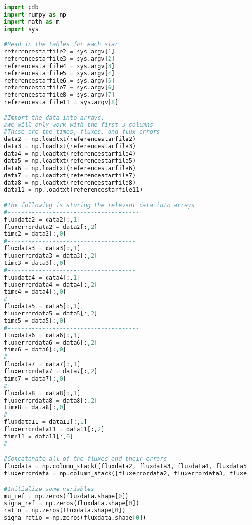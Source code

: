 \documentclass{aastex}
\begin{document}
\begin{lstlisting}[language = Python, caption = Creates table of values to be used for the final light curve (YM and JM)]
import pdb
import numpy as np
import math as m
import sys

#Read in the tables for each star
referencestarfile2 = sys.argv[1]
referencestarfile3 = sys.argv[2]
referencestarfile4 = sys.argv[3]
referencestarfile5 = sys.argv[4]
referencestarfile6 = sys.argv[5]
referencestarfile7 = sys.argv[6]
referencestarfile8 = sys.argv[7]
referencestarfile11 = sys.argv[8]

#Import the data into arrays.
#We will only work with the first 3 columns
#These are the times, fluxes, and flux errors
data2 = np.loadtxt(referencestarfile2)
data3 = np.loadtxt(referencestarfile3)
data4 = np.loadtxt(referencestarfile4)
data5 = np.loadtxt(referencestarfile5)
data6 = np.loadtxt(referencestarfile6)
data7 = np.loadtxt(referencestarfile7)
data8 = np.loadtxt(referencestarfile8)
data11 = np.loadtxt(referencestarfile11)

#The following is storing the relevent data into arrays
#--------------------------------------
fluxdata2 = data2[:,1]
fluxerrordata2 = data2[:,2]
time2 = data2[:,0]
#-------------------------------------
fluxdata3 = data3[:,1]
fluxerrordata3 = data3[:,2]
time3 = data3[:,0]
#-------------------------------------
fluxdata4 = data4[:,1]
fluxerrordata4 = data4[:,2]
time4 = data4[:,0]
#-------------------------------------
fluxdata5 = data5[:,1]
fluxerrordata5 = data5[:,2]
time5 = data5[:,0]
#--------------------------------------
fluxdata6 = data6[:,1]
fluxerrordata6 = data6[:,2]
time6 = data6[:,0]
#--------------------------------------
fluxdata7 = data7[:,1]
fluxerrordata7 = data7[:,2]
time7 = data7[:,0]
#---------------------------------------
fluxdata8 = data8[:,1]
fluxerrordata8 = data8[:,2]
time8 = data8[:,0]
#-------------------------------------
fluxdata11 = data11[:,1]
fluxerrordata11 = data11[:,2]
time11 = data11[:,0]
#------------------------------------

#Concatanate all of the fluxes and their errors
fluxdata = np.column_stack([fluxdata2, fluxdata3, fluxdata4, fluxdata5, fluxdata6, fluxdata7, fluxdata8])
fluxerrordata = np.column_stack([fluxerrordata2, fluxerrordata3, fluxerrordata4, fluxerrordata5, fluxerrordata6, fluxerrordata7, fluxerrordata8])

#Initialize some variables
mu_ref = np.zeros(fluxdata.shape[0])
sigma_ref = np.zeros(fluxdata.shape[0])
ratio = np.zeros(fluxdata.shape[0])
sigma_ratio = np.zeros(fluxdata.shape[0])


\end{lstlisting}
\end{document}
